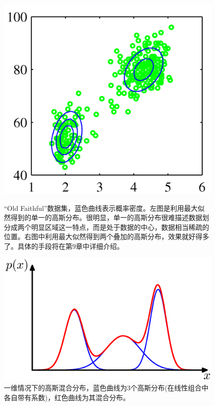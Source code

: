 \documentclass[b5paper]{book}
\numberwithin{equation}{chapter}
\begin{document}
{\begin{figure}[H]
\begin{minipage}[t]{0.5\linewidth}
		\label{fig:2-21a}
		\end{minipage}
		\begin{minipage}[t]{0.5\linewidth}
		\centering
		\includegraphics[scale=0.8]{Images/2-21b.png}
		\label{fig:2-21b}
		\end{minipage}
		\caption{“Old Faithful”数据集，蓝色曲线表示概率密度。左图是利用最大似然得到的单一的高斯分布。很明显，单一的高斯分布很难描述数据划分成两个明显区域这一特点，而是处于数据的中心，数据相当稀疏的位置。右图中利用最大似然得到两个叠加的高斯分布，效果就好得多了。具体的手段将在第9章中详细介绍。}
		\centering
		\includegraphics[scale=0.8]{Images/2-22.png}
		\caption{一维情况下的高斯混合分布，蓝色曲线为3个高斯分布(在线性组合中各自带有系数)，红色曲线为其混合分布。}

\end{figure}}
\end{document}
